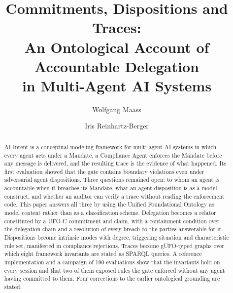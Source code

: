 \documentclass[runningheads]{llncs}
\begin{document}
\sloppy

\title{Commitments, Dispositions and Traces:\\
An Ontological Account of Accountable Delegation\\
in Multi-Agent AI Systems}

\author{Wolfgang Maass \and Iris Reinhartz-Berger}

\maketitle

\begin{abstract}
AI-Intent is a conceptual modeling framework for multi-agent AI systems in which every agent acts under a Mandate, a Compliance Agent enforces the Mandate before any message is delivered, and the resulting trace is the evidence of what happened. Its first evaluation showed that the gate contains boundary violations even under adversarial agent dispositions. Three questions remained open: to whom an agent is accountable when it breaches its Mandate, what an agent disposition is as a model construct, and whether an auditor can verify a trace without reading the enforcement code. This paper answers all three by using the Unified Foundational Ontology as model content rather than as a classification scheme. Delegation becomes a relator constituted by a UFO-C commitment and claim, with a containment condition over the delegation chain and a resolution of every breach to the parties answerable for it. Dispositions become intrinsic modes with degree, triggering situation and characteristic rule set, manifested in compliance rejections. Traces become gUFO-typed graphs over which eight framework invariants are stated as SPARQL queries. A reference implementation and a campaign of 190 evaluations show that the invariants hold on every session and that two of them exposed rules the gate enforced without any agent having committed to them. Four corrections to the earlier ontological grounding are stated.
\end{abstract}
\end{document}
